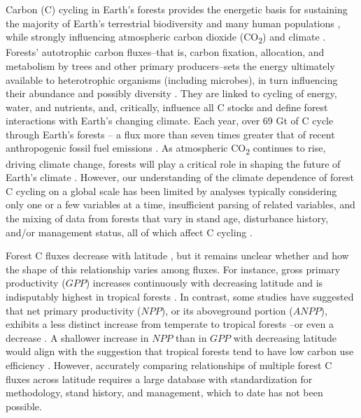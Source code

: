 \documentclass[
]{article}
\begin{document}
Carbon (C) cycling in Earth's forests provides the energetic basis for
sustaining the majority of Earth's terrestrial biodiversity and many
human populations
\citep{millennium_ecosystem_assessment_ecosystems_2005}, while strongly
influencing atmospheric carbon dioxide (CO\textsubscript{2}) and climate
\citep{bonan_forests_2008}. Forests' autotrophic carbon fluxes--that is,
carbon fixation, allocation, and metabolism by trees and other primary
producers--sets the energy ultimately available to heterotrophic
organisms (including microbes), in turn influencing their abundance
\citep{zak_plant_1994, niedzialkowska_species_2010} and possibly
diversity \citep{waide_relationship_1999, chu_direct_2018}. They are
linked to cycling of energy, water, and nutrients, and, critically,
influence all C stocks and define forest interactions with Earth's
changing climate. Each year, over 69 Gt of C cycle through Earth's
forests \citep{badgley_terrestrial_2019}-- a flux more than seven times
greater that of recent anthropogenic fossil fuel emissions \citep[9.5 Gt
C yr\textsuperscript{-1};][]{friedlingstein_global_2019}. As atmospheric
CO\textsubscript{2} continues to rise, driving climate change, forests
will play a critical role in shaping the future of Earth's climate
\citep{cavaleri_urgent_2015, rogelj_mitigation_2018}. However, our
understanding of the climate dependence of forest C cycling on a global
scale has been limited by analyses typically considering only one or a
few variables at a time, insufficient parsing of related variables, and
the mixing of data from forests that vary in stand age, disturbance
history, and/or management status, all of which affect C cycling
\citep{litton_carbon_2007, gillman_latitude_2015, simova_enigma_2017}.

Forest C fluxes decrease with latitude
\citep[e.g.,][]{luyssaert_co_2007, piao_forest_2010, gillman_latitude_2015, li_mapping_2019},
but it remains unclear whether and how the shape of this relationship
varies among fluxes. For instance, gross primary productivity (\(GPP\))
increases continuously with decreasing latitude and is indisputably
highest in tropical forests
\citep{luyssaert_co_2007, beer_terrestrial_2010, jung_global_2011, badgley_terrestrial_2019, li_mapping_2019}.
In contrast, some studies have suggested that net primary productivity
(\(NPP\)), or its aboveground portion (\(ANPP\)), exhibits a less
distinct increase from temperate to tropical forests
\citep{luyssaert_co_2007}--or even a decrease \citep[but see
\citet{gillman_latitude_2015}]{huston_global_2009}. A shallower increase
in \(NPP\) than in \(GPP\) with decreasing latitude would align with the
suggestion that tropical forests tend to have low carbon use efficiency
\citep[\(CUE\)=
\(NPP\)/\(GPP\);][]{de_lucia_forest_2007, malhi_productivity_2012, anderson-teixeira_carbon_2016}.
However, accurately comparing relationships of multiple forest C fluxes
across latitude requires a large database with standardization for
methodology, stand history, and management, which to date has not been
possible.
\end{document}
